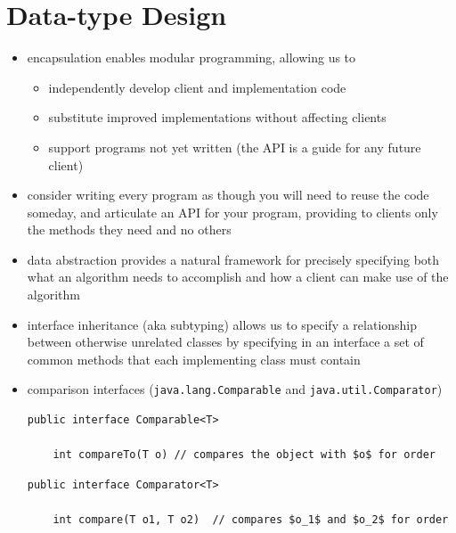 \documentclass[8pt,a4paper,compress]{beamer}
\begin{document}
\section{Data-type Design}
\begin{frame}[fragile]
\begin{itemize}
\item encapsulation enables modular programming, allowing us to
\begin{itemize}
\item independently develop client and implementation code
\item substitute improved implementations without affecting clients
\item support programs not yet written (the API is a guide for any future client)
\end{itemize}

\item consider writing every program as though you
will need to reuse the code someday, and articulate an API for your program, providing to clients only the methods they need and no others

\item data abstraction provides a natural framework for precisely specifying both what an algorithm needs to accomplish and how a client can make use of the algorithm
\end{itemize}
\end{frame}


\begin{frame}[fragile]
\begin{itemize}
\item interface inheritance (aka subtyping) allows us to specify a relationship between otherwise unrelated classes by specifying in
an interface a set of common methods that each implementing class must contain

\item comparison interfaces (\lstinline{java.lang.Comparable} and \lstinline{java.util.Comparator})
\begin{lstlisting}[language={},mathescape]
public interface Comparable<T>

    int compareTo(T o) // compares the object with $o$ for order
\end{lstlisting}

\begin{lstlisting}[language={},mathescape]
public interface Comparator<T>

    int compare(T o1, T o2)  // compares $o_1$ and $o_2$ for order
\end{lstlisting}
\end{itemize}
\end{frame}
\end{document}
